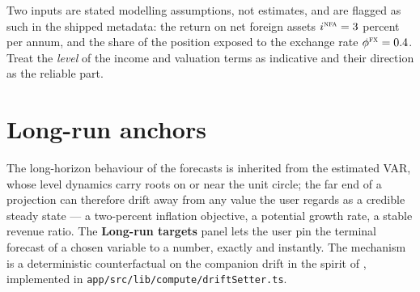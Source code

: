 \documentclass[11pt]{article}
\newcommand{\ui}[1]{\textbf{#1}}
\theoremstyle{plain}
\theoremstyle{remark}
\begin{document}
Two inputs are stated modelling assumptions, not estimates, and are
flagged as such in the shipped metadata: the return on net foreign
assets $i^{\textsc{nfa}} = 3$ percent per annum, and the share of the
position exposed to the exchange rate $\phi^{\textsc{fx}} = 0.4$. Treat
the \emph{level} of the income and valuation terms as indicative and
their direction as the reliable part.

\section{Long-run anchors}\label{sec:longrun}

The long-horizon behaviour of the forecasts is inherited from the
estimated VAR, whose level dynamics carry roots on or near the unit
circle; the far end of a projection can therefore drift away from any
value the user regards as a credible steady state --- a two-percent
inflation objective, a potential growth rate, a stable revenue ratio.
The \ui{Long-run targets} panel lets the user pin the terminal forecast
of a chosen variable to a number, exactly and instantly. The mechanism
is a deterministic counterfactual on the companion drift in the spirit
of \citet{Villani2009}, implemented in
\texttt{app/src/lib/compute/driftSetter.ts}.
\end{document}
